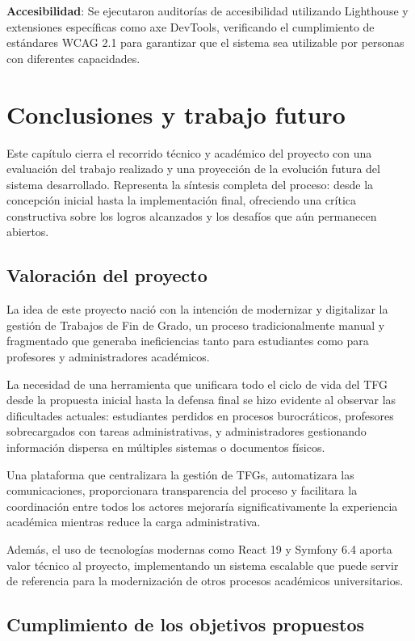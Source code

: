 \documentclass[12pt,a4paper,oneside]{report}
\begin{document}
\textbf{Accesibilidad}: Se ejecutaron auditorías de accesibilidad utilizando Lighthouse y extensiones específicas como axe DevTools, verificando el cumplimiento de estándares WCAG 2.1 para garantizar que el sistema sea utilizable por personas con diferentes capacidades.

\chapter{Conclusiones y trabajo
futuro}\label{conclusiones-y-trabajo-futuro}
Este capítulo cierra el recorrido técnico y académico del proyecto con una evaluación del trabajo realizado y una proyección de la evolución futura del sistema desarrollado. Representa la síntesis completa del proceso: desde la concepción inicial hasta la implementación final, ofreciendo una crítica constructiva sobre los logros alcanzados y los desafíos que aún permanecen abiertos.

\section{Valoración del proyecto}\label{valoraciuxf3n-del-proyecto}

La idea de este proyecto nació con la intención de modernizar y digitalizar la gestión de Trabajos de Fin de Grado, un proceso tradicionalmente manual y fragmentado que generaba ineficiencias tanto para estudiantes como para profesores y administradores académicos.

La necesidad de una herramienta que unificara todo el ciclo de vida del TFG desde la propuesta inicial hasta la defensa final se hizo evidente al observar las dificultades actuales: estudiantes perdidos en procesos burocráticos, profesores sobrecargados con tareas administrativas, y administradores gestionando información dispersa en múltiples sistemas o documentos físicos.

Una plataforma que centralizara la gestión de TFGs, automatizara las comunicaciones, proporcionara transparencia del proceso y facilitara la coordinación entre todos los actores mejoraría significativamente la experiencia académica mientras reduce la carga administrativa.

Además, el uso de tecnologías modernas como React 19 y Symfony 6.4 aporta valor técnico al proyecto, implementando un sistema escalable que puede servir de referencia para la modernización de otros procesos académicos universitarios.

\section{Cumplimiento de los objetivos
propuestos}\label{cumplimiento-de-los-objetivos-propuestos}
\end{document}
